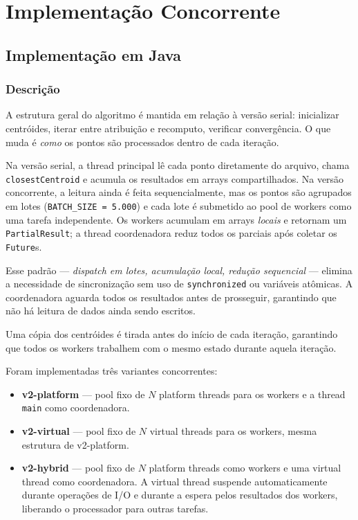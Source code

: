 \section{Implementação Concorrente}
\label{sec:concurrent}

\subsection{Implementação em Java}

\subsubsection{Descrição}

A estrutura geral do algoritmo é mantida em relação à versão serial: inicializar
centróides, iterar entre atribuição e recomputo, verificar convergência. O que muda
é \textit{como} os pontos são processados dentro de cada iteração.

Na versão serial, a thread principal lê cada ponto diretamente do arquivo, chama
\texttt{closestCentroid} e acumula os resultados em arrays compartilhados. Na versão
concorrente, a leitura ainda é feita sequencialmente, mas os pontos são agrupados em
lotes (\texttt{BATCH\_SIZE = 5.000}) e cada lote é submetido ao pool de workers como
uma tarefa independente. Os workers acumulam em arrays \emph{locais} e retornam um
\texttt{PartialResult}; a thread coordenadora reduz todos os parciais após coletar
os \texttt{Future}s.

Esse padrão --- \emph{dispatch em lotes, acumulação local, redução sequencial} ---
elimina a necessidade de sincronização sem uso de \texttt{synchronized} ou variáveis
atômicas. A coordenadora aguarda todos os resultados antes de prosseguir, garantindo
que não há leitura de dados ainda sendo escritos.

Uma cópia dos centróides é tirada antes do início de cada iteração, garantindo que
todos os workers trabalhem com o mesmo estado durante aquela iteração.

Foram implementadas três variantes concorrentes:

\begin{itemize}
    \item \textbf{v2-platform} --- pool fixo de $N$ platform threads para os workers
          e a thread \texttt{main} como coordenadora.
    \item \textbf{v2-virtual} --- pool fixo de $N$ virtual threads para os workers,
          mesma estrutura de v2-platform.
    \item \textbf{v2-hybrid} --- pool fixo de $N$ platform threads como workers
          e uma virtual thread como coordenadora. A virtual thread suspende
          automaticamente durante operações de I/O e durante a espera pelos
          resultados dos workers, liberando o processador para outras tarefas.
\end{itemize}

